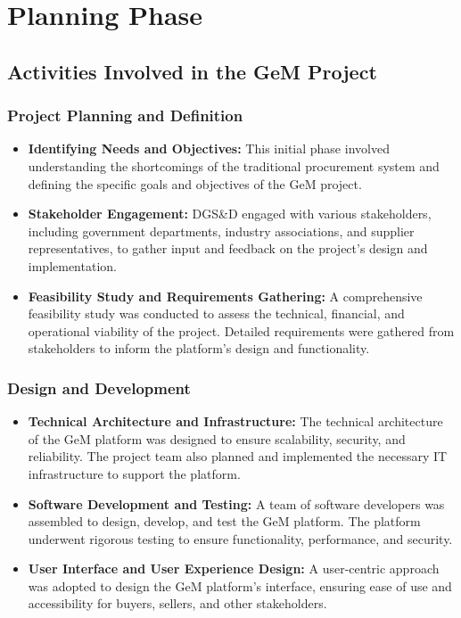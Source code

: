 \section{Planning Phase}

\subsection{Activities Involved in the GeM Project}

\subsubsection{Project Planning and Definition}

\begin{itemize}
    \item \textbf{Identifying Needs and Objectives:} This initial phase involved understanding the shortcomings of the traditional procurement system and defining the specific goals and objectives of the GeM project.
    
    \item \textbf{Stakeholder Engagement:} DGS\&D engaged with various stakeholders, including government departments, industry associations, and supplier representatives, to gather input and feedback on the project's design and implementation.
    
    \item \textbf{Feasibility Study and Requirements Gathering:} A comprehensive feasibility study was conducted to assess the technical, financial, and operational viability of the project. Detailed requirements were gathered from stakeholders to inform the platform's design and functionality.
\end{itemize}

\subsubsection{Design and Development}

\begin{itemize}
    \item \textbf{Technical Architecture and Infrastructure:} The technical architecture of the GeM platform was designed to ensure scalability, security, and reliability. The project team also planned and implemented the necessary IT infrastructure to support the platform.
    
    \item \textbf{Software Development and Testing:} A team of software developers was assembled to design, develop, and test the GeM platform. The platform underwent rigorous testing to ensure functionality, performance, and security.
    
    \item \textbf{User Interface and User Experience Design:} A user-centric approach was adopted to design the GeM platform's interface, ensuring ease of use and accessibility for buyers, sellers, and other stakeholders.
\end{itemize}

